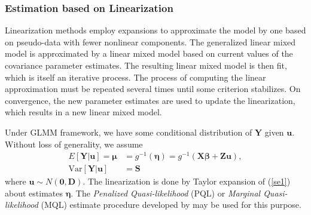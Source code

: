 	\subsubsection{Estimation based on Linearization}

	Linearization methods employ expansions to approximate the model by one based on pseudo-data with fewer nonlinear components. The generalized linear mixed model is approximated by a linear mixed model based on current values of the covariance parameter estimates. The resulting linear mixed model is then fit, which is itself an iterative process. The process of computing the linear approximation must be repeated several times until some criterion stabilizes.  On convergence, the new parameter estimates are used to update the linearization, which results in a new linear mixed model. 
	
	Under GLMM framework, we have some conditional distribution of $\bm Y$ given $\bm u$. Without loss of generality, we assume
	\begin{equation}\label{se1}
		\begin{aligned}
			E[\bm Y|\bm u] = \bm \mu &= g^{-1}(\bm \eta) = g^{-1}(\bm{X\beta} + \bm {Zu}), \\
			\text{Var}[\bm Y|\bm u]  & = \bm S
		\end{aligned}
	\end{equation}
	where $\bm u \sim N(\bm 0, \bm D)$.  The linearization  is done by Taylor expansion of (\ref{se1}) about estimates $\bm \eta$. The \textit{Penalized Quasi-likelihood } (PQL) or \textit{Marginal Quasi-likelihood} (MQL) estimate procedure developed by \cite{breslow1993approximate} may be used for this purpose. 
	
